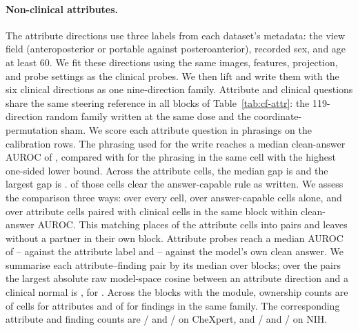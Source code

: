 \documentclass{article}
\begin{document}
\paragraph{Non-clinical attributes.} The attribute directions use three labels from each dataset's metadata: the view field (anteroposterior or portable against posteroanterior), recorded sex, and age at least 60. We fit these directions using the same images, features, projection, and probe settings as the clinical probes. We then lift and write them with the six clinical directions as one nine-direction family. Attribute and clinical questions share the same steering reference in all \cfAttrRefBlocks{} blocks of Table~\ref{tab:cf-attr}: the 119-direction random family written at the same dose and the coordinate-permutation sham. We score each attribute question in \cfAttrqPhrasings{} phrasings on the calibration rows. The phrasing used for the write reaches a median clean-answer AUROC of \cfAttrqWrittenAuroc{}, compared with \cfAttrqSelectedAuroc{} for the phrasing in the same cell with the highest one-sided lower bound. Across the \cfAttrqCells{} attribute cells, the median gap is \cfAttrqGain{} and the largest gap is \cfAttrqGainMax{}. \cfAttrqCapable{} of those cells clear the answer-capable rule as written. We assess the comparison three ways: over every cell, over answer-capable cells alone, and over attribute cells paired with clinical cells in the same block within \cfAttrPairWindow{} clean-answer AUROC. This matching places \cfAttrPairMatched{} of the \cfAttrPairCellsN{} attribute cells into \cfAttrPairAttrN{} pairs and leaves \cfAttrPairUnmatched{} without a partner in their own block. Attribute probes reach a median AUROC of \cfAttrAurocMin{}--\cfAttrAurocMax{} against the attribute label and \cfAttrAnswerAurocMin{}--\cfAttrAnswerAurocMax{} against the model's own clean answer. We summarise each attribute--finding pair by its median over blocks; over the \cfAttrCosPairs{} pairs the largest absolute raw model-space cosine between an attribute direction and a clinical normal is \cfAttrCosMax{}, for \cfAttrCosPairLabel{}. Across the \cfAttrBlocks{} blocks with the module, ownership counts are \cfAttrChestAttrOwned{} of \cfAttrChestAttrN{} cells for attributes and \cfAttrChestClinOwned{} of \cfAttrChestClinN{} for findings in the same family. The corresponding attribute and finding counts are \cfAttrChexAttrOwned{}/\cfAttrChexAttrN{} and \cfAttrChexClinOwned{}/\cfAttrChexClinN{} on CheXpert, and \cfAttrNihAttrOwned{}/\cfAttrNihAttrN{} and \cfAttrNihClinOwned{}/\cfAttrNihClinN{} on NIH.
\end{document}
